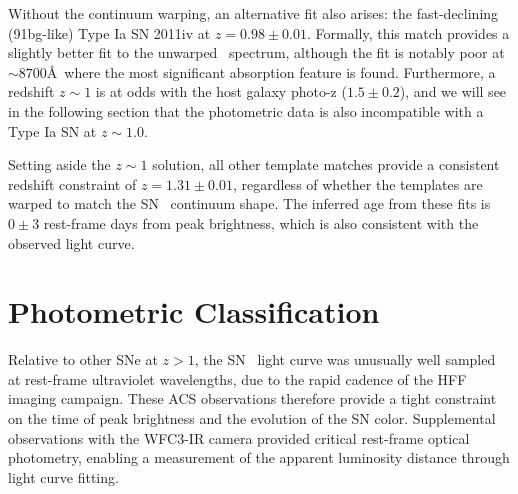 Without the continuum warping, an alternative
fit also arises: the fast-declining (91bg-like) Type Ia SN 2011iv at
$z=0.98\pm0.01$. Formally, this match provides a slightly better fit
to the unwarped \tomas\ spectrum, although the fit is notably poor at
$\sim8700$\AA\ where the most significant absorption feature is
found. Furthermore, a redshift $z\sim1$ is at odds with the host
galaxy photo-z ($1.5\pm0.2$), and we will see in the following section
that the photometric data is also incompatible with a Type Ia SN at
$z\sim1.0$.

Setting aside the $z\sim1$ solution, all other template matches
provide a consistent redshift constraint of $z=1.31\pm0.01$,
regardless of whether the templates are warped to match the SN \tomas\
continuum shape.  The inferred age from these fits is $0\pm3$
rest-frame days from peak brightness, which is also consistent with
the observed light curve.


\section{Photometric Classification}
\label{sec:PhotometricClassification}

Relative to other SNe at $z>1$, the SN \tomas\ light curve was
unusually well sampled at rest-frame ultraviolet wavelengths, due to
the rapid cadence of the HFF imaging campaign. These ACS observations
therefore provide a tight constraint on the time of peak brightness
and the evolution of the SN color.  Supplemental observations with the
WFC3-IR camera provided critical rest-frame optical photometry,
enabling a measurement of the apparent luminosity distance through
light curve fitting.

